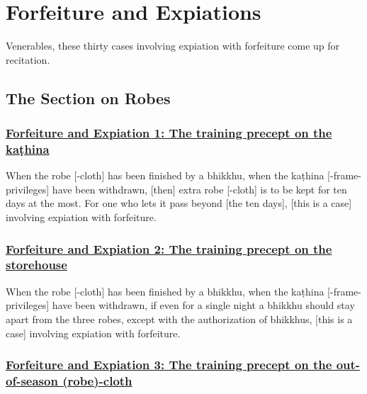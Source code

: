 
\section{Forfeiture and Expiations}
\label{forf-exp}

\begin{intro}
	Venerables, these thirty cases involving expiation with forfeiture come up for recitation.
\end{intro}

\setsubsecheadstyle{\subsectionFmt}
\subsection{The Section on Robes}
\label{forf-exp-vagga1}
\label{forf-exp-robes}

\subsubsection*{\hyperref[np1]{Forfeiture and Expiation 1: The training precept on the kaṭhina}}
\label{forf-exp1}

When the robe [-cloth] has been finished by a bhikkhu, when the kaṭhina [-frame-privileges] have been withdrawn, [then] extra robe [-cloth] is to be kept for ten days at the most. For one who lets it pass beyond [the ten days], [this is a case] involving expiation with forfeiture.



\subsubsection*{\hyperref[np2]{Forfeiture and Expiation 2: The training precept on the storehouse}}
\label{forf-exp2}

When the robe [-cloth] has been finished by a bhikkhu, when the kaṭhina [-frame-privileges] have been withdrawn, if even for a single night a bhikkhu should stay apart from the three robes, except with the authorization of bhikkhus, [this is a case] involving expiation with forfeiture.



\subsubsection*{\hyperref[np3]{Forfeiture and Expiation 3: The training precept on the out-of-season (robe)-cloth}}
\label{forf-exp3}

